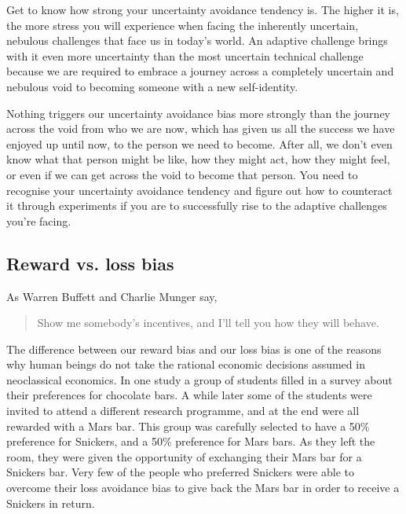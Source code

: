 Get to know how strong your uncertainty avoidance tendency is. The higher it is, the more stress you will experience when facing the inherently uncertain, nebulous challenges that face us in today's world. An adaptive challenge brings with it even more uncertainty  than the most uncertain technical challenge because we are required to embrace a journey across a completely uncertain and nebulous void to becoming someone with a new self-identity. 


Nothing triggers our uncertainty avoidance bias more strongly than the journey across the void from who we are now, which has given us all the success we have enjoyed up until now, to the person we need to become. After all, we don't even know what that person might be like, how they might act, how they might feel, or even if we can get across the void to become that person. You need to recognise your uncertainty avoidance tendency and figure out how to counteract it through experiments if you are to successfully rise to the adaptive challenges you're facing.
\subsection{Reward vs. loss bias}
\label{section:reward-loss}
As Warren Buffett  and Charlie Munger  say, 


\begin{quote}
Show me somebody's incentives, and I'll tell you how they will behave.
\end{quote}


The difference between our reward bias and our loss bias is one of the reasons why human beings do not take the rational economic decisions assumed in neoclassical economics. In one study a group of students filled in a survey about their preferences for chocolate bars. A while later some of the students were invited to attend a different research programme, and at the end were all rewarded with a Mars bar. This group was carefully selected to have a 50\% preference for Snickers, and a 50\% preference for Mars bars. As they left the room, they were given the opportunity of exchanging their Mars bar for a Snickers bar. Very few of the people who preferred Snickers were able to overcome their loss avoidance bias to give back the Mars bar in order to receive a Snickers in return.


